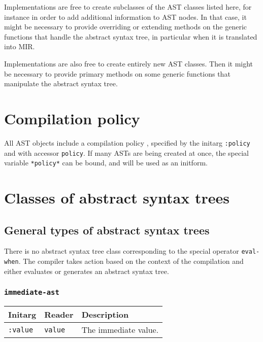 Implementations are free to create subclasses of the AST classes
listed here, for instance in order to add additional information to
AST nodes.  In that case, it might be necessary to provide overriding
or extending methods on the generic functions that handle the abstract
syntax tree, in particular when it is translated into MIR.  

Implementations are also free to create entirely new AST classes.
Then it might be necessary to provide primary methods on some generic
functions that manipulate the abstract syntax tree.%

\section{Compilation policy}

All AST objects include a compilation policy ,
specified by the initarg \texttt{:policy} and with accessor
\texttt{policy}. If many ASTs are being created at once, the
special variable \texttt{*policy*} can be bound, and will be used
as an initform.

\section{Classes of abstract syntax trees}

\subsection{General types of abstract syntax trees}

There is no abstract syntax tree class corresponding to the special
operator \texttt{eval-when}.  The compiler takes action based on the
context of the compilation and either evaluates or generates an
abstract syntax tree.

\subsubsection{\texttt{immediate-ast}}
\label{immediate-ast}

\begin{tabular}{|l|l|l|}
\hline
Initarg & Reader & Description\\
\hline\hline
\texttt{:value} & \texttt{value} & The immediate value.\\
\hline
\end{tabular}

